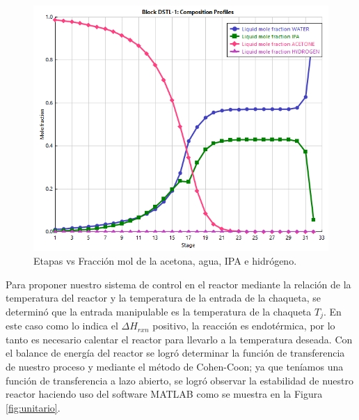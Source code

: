         \begin{figure}[H]
            \centering
            \includegraphics[scale=0.8]{images/etapas_vs_fracmol.PNG}
            \caption{Etapas vs Fracción mol de la acetona, agua, IPA e hidrógeno.}
            \label{fig:frac_mol}
        \end{figure}
    Para proponer nuestro sistema de control en el reactor mediante la relación de la 
    temperatura del reactor y la temperatura de la entrada de la chaqueta, se determinó 
    que la entrada manipulable  es la temperatura de la chaqueta $T_j$. En este caso como lo 
    indica el $\Delta H_{rxn} $ positivo, la reacción es endotérmica, por lo tanto es necesario
    calentar el reactor para llevarlo a la temperatura deseada. Con el balance de energía del 
    reactor se logró determinar la función de transferencia de nuestro proceso y mediante el 
    método de Cohen-Coon; ya que teníamos una función de transferencia a lazo abierto, se logró
    observar la estabilidad de nuestro reactor haciendo uso del software MATLAB como se muestra en 
    la Figura \ref{fig:unitario}.



